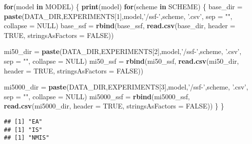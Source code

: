 \documentclass[]{book}
\newenvironment{Shaded}{\begin{snugshade}}{\end{snugshade}}
\newcommand{\ControlFlowTok}[1]{\textcolor[rgb]{0.13,0.29,0.53}{\textbf{#1}}}
\newcommand{\DataTypeTok}[1]{\textcolor[rgb]{0.13,0.29,0.53}{#1}}
\newcommand{\DecValTok}[1]{\textcolor[rgb]{0.00,0.00,0.81}{#1}}
\newcommand{\KeywordTok}[1]{\textcolor[rgb]{0.13,0.29,0.53}{\textbf{#1}}}
\newcommand{\NormalTok}[1]{#1}
\newcommand{\OtherTok}[1]{\textcolor[rgb]{0.56,0.35,0.01}{#1}}
\newcommand{\StringTok}[1]{\textcolor[rgb]{0.31,0.60,0.02}{#1}}
\begin{document}
\begin{Shaded}
\begin{Highlighting}[]
\ControlFlowTok{for}\NormalTok{(model }\ControlFlowTok{in}\NormalTok{ MODEL)}
\NormalTok{\{}
  \KeywordTok{print}\NormalTok{(model)}
  \ControlFlowTok{for}\NormalTok{(scheme }\ControlFlowTok{in}\NormalTok{ SCHEME)}
\NormalTok{  \{}
\NormalTok{    base_dir =}\StringTok{ }\KeywordTok{paste}\NormalTok{(DATA_DIR,EXPERIMENTS[}\DecValTok{1}\NormalTok{],model,}\StringTok{'/ssf-'}\NormalTok{,scheme, }\StringTok{'.csv'}\NormalTok{, }\DataTypeTok{sep =} \StringTok{""}\NormalTok{, }\DataTypeTok{collapse =} \OtherTok{NULL}\NormalTok{)}
\NormalTok{    base_ssf =}\StringTok{ }\KeywordTok{rbind}\NormalTok{(base_ssf, }\KeywordTok{read.csv}\NormalTok{(base_dir, }\DataTypeTok{header =} \OtherTok{TRUE}\NormalTok{, }\DataTypeTok{stringsAsFactors =} \OtherTok{FALSE}\NormalTok{))}

\NormalTok{    mi50_dir =}\StringTok{ }\KeywordTok{paste}\NormalTok{(DATA_DIR,EXPERIMENTS[}\DecValTok{2}\NormalTok{],model,}\StringTok{'/ssf-'}\NormalTok{,scheme, }\StringTok{'.csv'}\NormalTok{, }\DataTypeTok{sep =} \StringTok{""}\NormalTok{, }\DataTypeTok{collapse =} \OtherTok{NULL}\NormalTok{)}
\NormalTok{    mi50_ssf =}\StringTok{ }\KeywordTok{rbind}\NormalTok{(mi50_ssf, }\KeywordTok{read.csv}\NormalTok{(mi50_dir, }\DataTypeTok{header =} \OtherTok{TRUE}\NormalTok{, }\DataTypeTok{stringsAsFactors =} \OtherTok{FALSE}\NormalTok{))}

\NormalTok{    mi5000_dir =}\StringTok{ }\KeywordTok{paste}\NormalTok{(DATA_DIR,EXPERIMENTS[}\DecValTok{3}\NormalTok{],model,}\StringTok{'/ssf-'}\NormalTok{,scheme, }\StringTok{'.csv'}\NormalTok{, }\DataTypeTok{sep =} \StringTok{""}\NormalTok{, }\DataTypeTok{collapse =} \OtherTok{NULL}\NormalTok{)}
\NormalTok{    mi5000_ssf =}\StringTok{ }\KeywordTok{rbind}\NormalTok{(mi5000_ssf, }\KeywordTok{read.csv}\NormalTok{(mi5000_dir, }\DataTypeTok{header =} \OtherTok{TRUE}\NormalTok{, }\DataTypeTok{stringsAsFactors =} \OtherTok{FALSE}\NormalTok{))}
\NormalTok{  \}}
\NormalTok{\}}
\end{Highlighting}
\end{Shaded}

\begin{verbatim}
## [1] "EA"
## [1] "IS"
## [1] "NMIS"
\end{verbatim}
\end{document}
